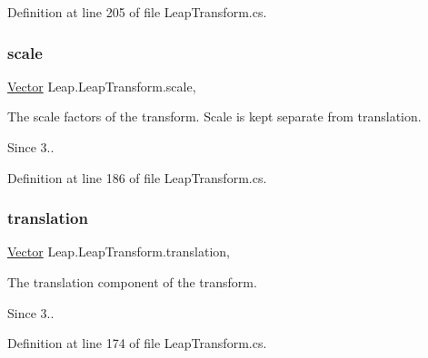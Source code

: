 Definition at line 205 of file Leap\+Transform.\+cs.

\mbox{\label{struct_leap_1_1_leap_transform_ac8b265b9dfa089183c263bbe7ff0e42d}} 
\subsubsection{\texorpdfstring{scale}{scale}}
{\footnotesize\ttfamily \mbox{\hyperlink{struct_leap_1_1_vector}{Vector}} Leap.\+Leap\+Transform.\+scale\hspace{0.3cm}{\ttfamily [get]}, {\ttfamily [set]}}



The scale factors of the transform. Scale is kept separate from translation. 

\begin{DoxySince}{Since}
3.. 
\end{DoxySince}


Definition at line 186 of file Leap\+Transform.\+cs.

\mbox{\label{struct_leap_1_1_leap_transform_ac7de7c75b3f77718715055990131f08b}} 
\subsubsection{\texorpdfstring{translation}{translation}}
{\footnotesize\ttfamily \mbox{\hyperlink{struct_leap_1_1_vector}{Vector}} Leap.\+Leap\+Transform.\+translation\hspace{0.3cm}{\ttfamily [get]}, {\ttfamily [set]}}



The translation component of the transform. 

\begin{DoxySince}{Since}
3.. 
\end{DoxySince}


Definition at line 174 of file Leap\+Transform.\+cs.

\mbox{\label{struct_leap_1_1_leap_transform_a8a67b81b7344f05e136048e2159ab663}} 
